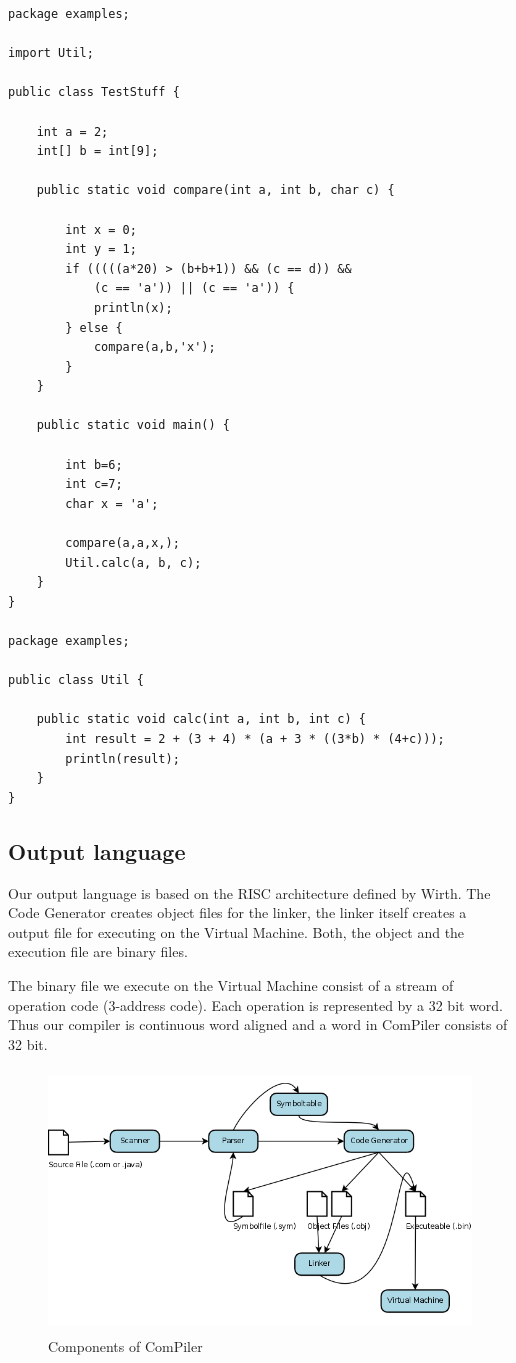 \begin{lstlisting}[caption={Input language example},label={example}]
package examples;

import Util;

public class TestStuff {

	int a = 2;
	int[] b = int[9];
	
	public static void compare(int a, int b, char c) {

		int x = 0;
		int y = 1;
		if (((((a*20) > (b+b+1)) && (c == d)) && 
			(c == 'a')) || (c == 'a')) {
			println(x);
		} else {
			compare(a,b,'x');
		}
	}
	
	public static void main() {
		
		int b=6;
		int c=7;
		char x = 'a';

		compare(a,a,x,);
		Util.calc(a, b, c);
	}
}

package examples;

public class Util {
	
	public static void calc(int a, int b, int c) {
		int result = 2 + (3 + 4) * (a + 3 * ((3*b) * (4+c)));
		println(result);
	}
}
\end{lstlisting}

\subsection{Output language}
Our output language is based on the RISC architecture defined by Wirth. The Code Generator creates object files for the linker, the linker itself creates a output file for executing on the Virtual Machine. Both, the object and the execution file are binary files.

The binary file we execute on the Virtual Machine consist of a stream of operation code (3-address code). Each operation is represented by a 32 bit word. Thus our compiler is continuous word aligned and a word in ComPiler consists of 32 bit. 

\begin{figure}[h]
\label{components}
\begin{center}
\includegraphics[width=13cm,height=7cm]{images/compParts.png}
\end{center}
\caption{Components of ComPiler}
\end{figure}


